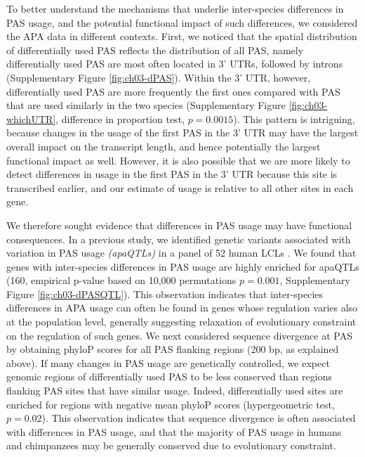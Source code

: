 To better understand the mechanisms that underlie inter-species differences in PAS usage, and the potential functional impact of such differences, we considered the APA data in different contexts. First, we noticed that the spatial distribution of differentially used PAS reflects the distribution of all PAS, namely differentially used PAS are most often located in 3' UTRs, followed by introns (Supplementary Figure \ref{fig:ch03-dPAS}). Within the 3' UTR, however, differentially used PAS are more frequently the first ones compared with PAS that are used similarly in the two species (Supplementary Figure \ref{fig:ch03-whichUTR}, difference in proportion test, $p=0.0015$). This pattern is intriguing, because changes in the usage of the first PAS in the 3' UTR may have the largest overall impact on the transcript length, and hence potentially the largest functional impact as well. However, it is also possible that we are more likely to detect differences in usage in the first PAS in the 3' UTR because this site is transcribed earlier, and our estimate of usage is relative to all other sites in each gene. 

We therefore sought evidence that differences in PAS usage may have functional consequences. In a previous study, we identified genetic variants associated with variation in PAS usage \emph{(apaQTLs)} in a panel of 52 human LCLs \citep{mittleman_alternative_2020}. We found that genes with inter-species differences in PAS usage are highly enriched for apaQTLs (160, empirical p-value based on 10,000 permutations $p=0.001$, Supplementary Figure \ref{fig:ch03-dPASQTL}). This observation indicates that inter-species differences in APA usage can often be found in genes whose regulation varies also at the population level, generally suggesting relaxation of evolutionary constraint on the regulation of such genes. We next considered sequence divergence at PAS by obtaining phyloP scores for all PAS flanking regions (200 bp, as explained above). If many changes in PAS usage are genetically controlled, we expect genomic regions of differentially used PAS to be less conserved than regions flanking PAS sites that have similar usage. Indeed, differentially used sites are enriched for regions with negative mean phyloP scores (hypergeometric test, $p=0.02$). This observation indicates that sequence divergence is often associated with differences in PAS usage, and that the majority of PAS usage in humans and chimpanzees may be generally conserved due to evolutionary constraint. 


